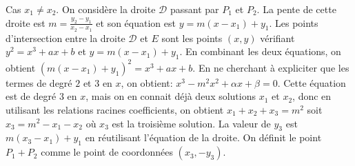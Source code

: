 \documentclass{article}
\theoremstyle{plain}%
\theoremstyle{definition}%
\begin{document}
\begin{center}
\end{center}
{\color{blue}Cas $x_1\neq x_2$.} On considère la droite $\mathcal D$ passant par $P_1$ et $P_2$. La pente de cette droite est $m = \frac{y_2-y_1}{x_2-x_1}$ et son équation est $y = m(x-x_1) + y_1$. Les points d'intersection entre la droite $\mathcal D$ et $E$ sont les points $(x, y)$ vérifiant $y^2 = x^3 + ax + b$ et $y = m(x-x_1) + y_1$. En combinant les deux équations, on obtient $(m(x-x_1) + y_1)^2 =  x^3 + ax + b$. 
En ne cherchant à expliciter que les termes de degré $2$ et $3$ en $x$, on obtient: $ x^3 -m^2x^2 + \alpha x + \beta = 0$. 
Cette équation est de degré $3$ en $x$, mais on en connait déjà  deux solutions $x_1$ et $x_2$, donc en utilisant les relations racines coefficients, on obtient $x_1+x_2+x_3 = m^2$ soit $x_3 = m^2 - x_1 - x_2$ où $x_3$ est la troisième solution. La valeur de $y_3$ est $m(x_3-x_1)+y_1$ en réutilisant l'équation de la droite. On définit le point $P_1 + P_2$ comme le point de coordonnées $(x_3, -y_3)$.
\end{document}
